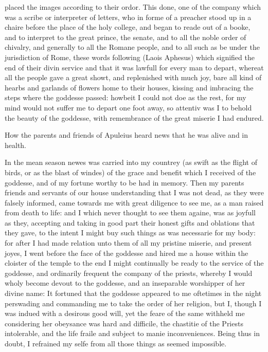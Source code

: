placed the images according to their ordor. This done, one of the company which
was a scribe or interpreter of letters, who in forme of a preacher stood up in
a chaire before the place of the holy college, and began to reade out of a
booke, and to interpret to the great prince, the senate, and to all the noble
order of chivalry, and generally to all the Romane people, and to all such as
be under the jurisdiction of Rome, these words following (Laois Aphesus) which
signified the end of their divin service and that it was lawfull for every man
to depart, whereat all the people gave a great showt, and replenished with much
joy, bare all kind of hearbs and garlands of flowers home to their houses,
kissing and imbracing the steps where the goddesse passed: howbeit I could not
doe as the rest, for my mind would not suffer me to depart one foot away, so
attentiv was I to behold the beauty of the goddesse, with remembrance of the
great miserie I had endured.


How the parents and friends of Apuleius heard news that he was alive and in
health.

In the mean season newes was carried into my countrey (as swift as the flight
of birds, or as the blast of windes) of the grace and benefit which I received
of the goddesse, and of my fortune worthy to be had in memory. Then my parents
friends and servants of our house understanding that I was not dead, as they
were falsely informed, came towards me with great diligence to see me, as a man
raised from death to life: and I which never thought to see them againe, was as
joyfull as they, accepting and taking in good part their honest gifts and
oblations that they gave, to the intent I might buy such things as was
necessarie for my body: for after I had made relation unto them of all my
pristine miserie, and present joyes, I went before the face of the goddesse and
hired me a house within the cloister of the temple to the end I might
continually be ready to the service of the goddesse, and ordinarily frequent
the company of the priests, whereby I would wholy become devout to the
goddesse, and an inseparable worshipper of her divine name: It fortuned that
the goddesse appeared to me oftetimes in the night perswading and commanding me
to take the order of her religion, but I, though I was indued with a desirous
good will, yet the feare of the same withheld me considering her obeysance was
hard and difficile, the chastitie of the Priests intolerable, and the life
fraile and subject to manie inconveniences. Being thus in doubt, I refrained my
selfe from all those things as seemed impossible.


